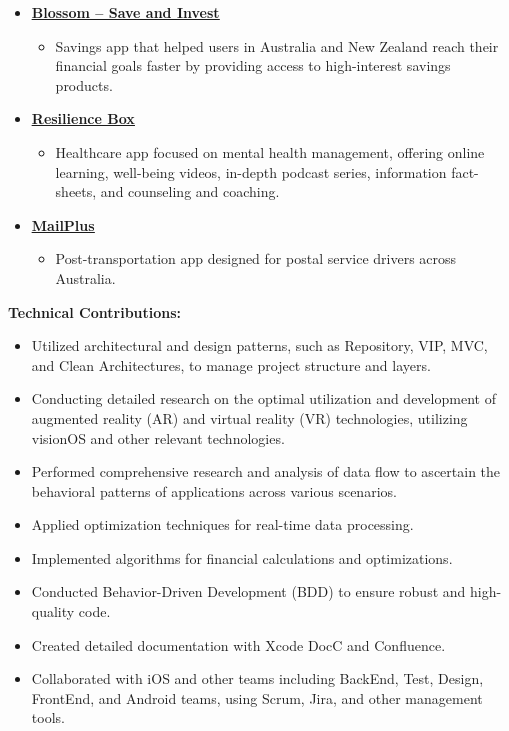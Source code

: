 \documentclass[letter,12pt]{article}
\newcommand{\customsquare}{\raisebox{0.25ex}{\scalebox{0.45}{$\blacksquare$}}}
\begin{document}
\begin{itemize}[label={\customsquare}]
    \item \href{https://www.blossomapp.com}{\underline{\textbf{Blossom -- Save and Invest}}}
    \begin{itemize}
        \item Savings app that helped users in Australia and New Zealand reach their financial goals faster by providing access to high-interest savings products.
    \end{itemize}
    
    \item \href{https://app.resiliencebox.com}{\underline{\textbf{Resilience Box}}}
    \begin{itemize}
        \item Healthcare app focused on mental health management, offering online learning, well-being videos, in-depth podcast series, information fact-sheets, and counseling and coaching.
    \end{itemize}

    \item \href{https://mailplus.com.au}{\underline{\textbf{MailPlus}}}
    \begin{itemize}
        \item Post-transportation app designed for postal service drivers across Australia.
    \end{itemize}
\end{itemize}

\textbf{Technical Contributions:}
\begin{itemize}[label={\customsquare}]
    \item Utilized architectural and design patterns, such as Repository, VIP, MVC, and Clean Architectures, to manage project structure and layers.
    \item Conducting detailed research on the optimal utilization and development of augmented reality (AR) and virtual reality (VR) technologies, utilizing visionOS and other relevant technologies.
    \item Performed comprehensive research and analysis of data flow to ascertain the behavioral patterns of applications across various scenarios.
    \item Applied optimization techniques for real-time data processing.
    \item Implemented algorithms for financial calculations and optimizations.
    \item Conducted Behavior-Driven Development (BDD) to ensure robust and high-quality code.
    \item Created detailed documentation with Xcode DocC and Confluence.
    \item Collaborated with iOS and other teams including BackEnd, Test, Design, FrontEnd, and Android teams, using Scrum, Jira, and other management tools.
\end{itemize}
\end{document}
